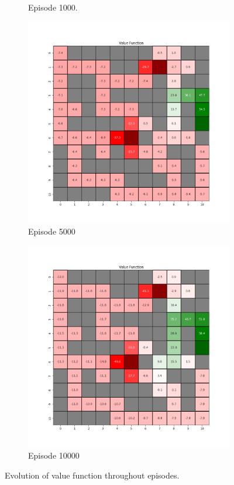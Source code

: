 \documentclass{assignment}
\begin{document}
\begin{figure}[H]
\begin{subfigure}{0.3\textwidth}
    \caption{Episode 1000.}
    \end{subfigure}\hfill
    \begin{subfigure}{0.3\textwidth}
        \includegraphics[width=\textwidth]{figures/value_td/alpha_sweep/value_function_alpha_0.001_gamma_0.95_epsilon_0.2_iteration_5000.png}
    \caption{Episode 5000}
    \end{subfigure}\hfill
    \begin{subfigure}{0.3\textwidth}
        \includegraphics[width=\textwidth]{figures/value_td/alpha_sweep/value_function_alpha_0.001_gamma_0.95_epsilon_0.2_iteration_10000.png}
    \caption{Episode 10000}
    \end{subfigure}
    \caption{Evolution of value function throughout episodes.}
    \label{fig:alpha_0.001_td_learning_value}
\end{figure}
\end{document}
